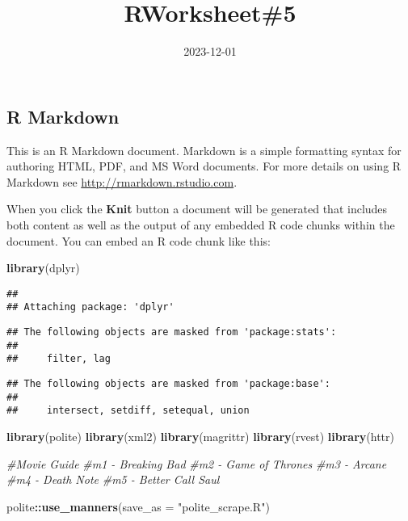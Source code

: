 \documentclass[
]{article}
\title{RWorksheet\#5}
\author{}
\date{\vspace{-2.5em}2023-12-01}
\newenvironment{Shaded}{\begin{snugshade}}{\end{snugshade}}
\newcommand{\AttributeTok}[1]{\textcolor[rgb]{0.13,0.29,0.53}{#1}}
\newcommand{\CommentTok}[1]{\textcolor[rgb]{0.56,0.35,0.01}{\textit{#1}}}
\newcommand{\FunctionTok}[1]{\textcolor[rgb]{0.13,0.29,0.53}{\textbf{#1}}}
\newcommand{\NormalTok}[1]{#1}
\newcommand{\SpecialCharTok}[1]{\textcolor[rgb]{0.81,0.36,0.00}{\textbf{#1}}}
\newcommand{\StringTok}[1]{\textcolor[rgb]{0.31,0.60,0.02}{#1}}
\begin{document}
\maketitle

\hypertarget{r-markdown}{%
\subsection{R Markdown}\label{r-markdown}}

This is an R Markdown document. Markdown is a simple formatting syntax
for authoring HTML, PDF, and MS Word documents. For more details on
using R Markdown see \url{http://rmarkdown.rstudio.com}.

When you click the \textbf{Knit} button a document will be generated
that includes both content as well as the output of any embedded R code
chunks within the document. You can embed an R code chunk like this:

\begin{Shaded}
\begin{Highlighting}[]
\FunctionTok{library}\NormalTok{(dplyr)}
\end{Highlighting}
\end{Shaded}

\begin{verbatim}
## 
## Attaching package: 'dplyr'
\end{verbatim}

\begin{verbatim}
## The following objects are masked from 'package:stats':
## 
##     filter, lag
\end{verbatim}

\begin{verbatim}
## The following objects are masked from 'package:base':
## 
##     intersect, setdiff, setequal, union
\end{verbatim}

\begin{Shaded}
\begin{Highlighting}[]
\FunctionTok{library}\NormalTok{(polite)}
\FunctionTok{library}\NormalTok{(xml2)}
\FunctionTok{library}\NormalTok{(magrittr)}
\FunctionTok{library}\NormalTok{(rvest)}
\FunctionTok{library}\NormalTok{(httr)}


\CommentTok{\#Movie Guide}
\CommentTok{\#m1 {-} Breaking Bad}
\CommentTok{\#m2 {-} Game of Thrones}
\CommentTok{\#m3 {-} Arcane}
\CommentTok{\#m4 {-} Death Note}
\CommentTok{\#m5 {-} Better Call Saul}

\NormalTok{polite}\SpecialCharTok{::}\FunctionTok{use\_manners}\NormalTok{(}\AttributeTok{save\_as =} \StringTok{"polite\_scrape.R"}\NormalTok{)}
\end{Highlighting}
\end{Shaded}
\end{document}
